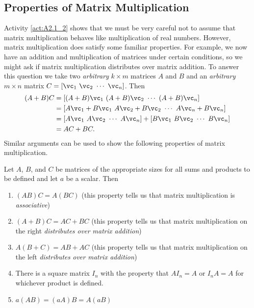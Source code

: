 \subsection*{Properties of Matrix Multiplication}

Activity \ref{act:A2.1_2} shows that we must be very careful not to assume that matrix multiplication behaves like multiplication of real numbers. However, matrix multiplication does satisfy some familiar properties. For example, we now have an addition and multiplication of matrices under certain conditions, so we might ask if matrix multiplication distributes over matrix addition. To answer this question we take two \emph{arbitrary} $k \times m$ matrices $A$ and $B$ and an \emph{arbitrary} $m \times n$ matrix $C =  [\vc_1 \ \vc_2 \ \cdots \ \vc_n]$. Then
\begin{align*}
(A+B)C &= [(A+B)\vc_1 \ (A+B)\vc_2 \ \cdots \ (A+B)\vc_n] \\
    &= [A\vc_1+B\vc_1 \ A\vc_2+B\vc_2 \ \cdots \ A\vc_n+B\vc_n] \\
    &= [A\vc_1 \ A\vc_2 \ \cdots \ A\vc_n] + [B\vc_1 \ B\vc_2 \ \cdots \ B\vc_n] \\
    &= AC + BC.
\end{align*}
Similar arguments can be used to show the following properties of matrix multiplication.



\begin{theorem} \label{thm:matrix_product_properties}  Let $A$, $B$, and $C$ be matrices of the appropriate sizes for all sums and products to be defined and let $a$ be a scalar. Then
\begin{enumerate}
\item $(AB)C = A(BC)$  (this property tells us that matrix multiplication is \emph{associative})
\item $(A+B)C = AC + BC$ (this property tells us that matrix multiplication on the right \emph{distributes over matrix addition})
\item $A(B+C) = AB + AC$ (this property tells us that matrix multiplication on the left \emph{distributes over matrix addition})
\item There is a square matrix $I_n$ with the property that $AI_n = A$ or $I_nA = A$ for whichever product is defined. 
\item $a(AB) = (aA)B = A(aB)$
\end{enumerate}
\end{theorem}



